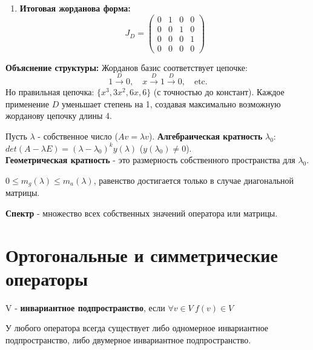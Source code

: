 \documentclass[12pt]{article}
\begin{document}
\begin{examplebox}
\begin{enumerate}
    \item \textbf{Итоговая жорданова форма:}
    \[
    J_D = \begin{pmatrix}
        0 & 1 & 0 & 0 \\
        0 & 0 & 1 & 0 \\
        0 & 0 & 0 & 1 \\
        0 & 0 & 0 & 0
    \end{pmatrix}
    \]
\end{enumerate}

\textbf{Объяснение структуры:}
Жорданов базис соответствует цепочке:
\[ 1 \xrightarrow{D} 0, \quad x \xrightarrow{D} 1 \xrightarrow{D} 0, \quad \text{etc.} \]
Но правильная цепочка: $\{x^3, 3x^2, 6x, 6\}$ (с точностью до констант). Каждое применение $D$ уменьшает степень на 1, создавая максимально возможную жорданову цепочку длины 4.
\end{examplebox}

\begin{definitionbox}
    Пусть $\lambda$ - собственное число ($Av = \lambda v$). \textbf{Алгебраическая кратность} $\lambda_0$: $det(A - \lambda E) = (\lambda - \lambda_0)^k y(\lambda)$ ($y(\lambda_0) \neq 0$).\\

    \textbf{Геометрическая кратность} - это размерность собственного пространства для $\lambda_0$. 
\end{definitionbox}

\begin{remarkbox}
    $0 \leq m_g(\lambda) \leq m_a(\lambda)$, равенство достигается только в случае диагональной матрицы.
\end{remarkbox}

\begin{definitionbox}
    \textbf{Спектр} - множество всех собственных значений оператора или матрицы.
\end{definitionbox}

\section{Ортогональные и симметрические операторы}

\begin{definitionbox}
    V - \textbf{инвариантное подпространство}, если $\forall v \in V \ f(v) \in V$
\end{definitionbox}

\begin{theorembox}
    У любого оператора всегда существует либо одномерное инвариантное подпространство, либо двумерное инвариантное подпространство.
\end{theorembox}
\end{document}
